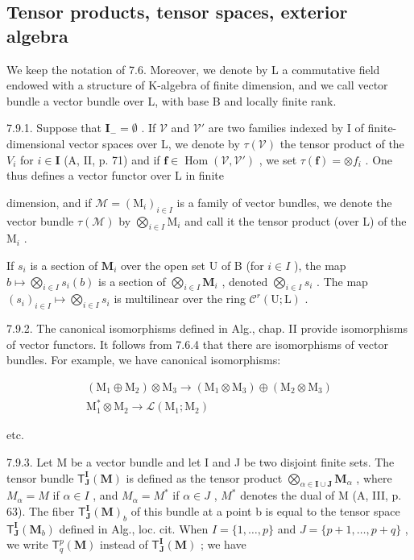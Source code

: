 \subsection{Tensor products, tensor spaces, exterior algebra}

We keep the notation of 7.6. Moreover, we denote by L a commutative field endowed with a structure of K-algebra of finite dimension, and we call vector bundle a vector bundle over L, with base B and locally finite rank.

7.9.1. Suppose that \(\mathbf{I}_{-} = \emptyset\) . If \(\mathcal{V}\) and \(\mathcal{V}'\) are two families indexed by I of finite-dimensional vector spaces over L, we denote by \(\tau(\mathcal{V})\) the tensor product of the \(V_{i}\) for \(i \in \mathbf{I}\) (A, II, p. 71) and if \(\mathbf{f} \in \operatorname{Hom}(\mathcal{V}, \mathcal{V}')\) , we set \(\tau(\mathbf{f}) = \otimes f_{i}\) . One thus defines a vector functor over L in finite

dimension, and if \(\mathcal{M} = (\mathrm{M}_{i})_{i\in I}\) is a family of vector bundles, we denote the vector bundle \(\tau(\mathcal{M})\) by \(\bigotimes_{i\in I}\mathrm{M}_{i}\) and call it the tensor product (over L) of the \(\mathrm{M}_{i}\) .

If \(s_i\) is a section of \(\mathbf{M}_i\) over the open set U of B (for \(i \in I\) ), the map \(b \mapsto \bigotimes_{i \in I} s_i(b)\) is a section of \(\bigotimes_{i \in I} \mathbf{M}_i\) , denoted \(\bigotimes_{i \in I} s_i\) . The map \((s_i)_{i \in I} \mapsto \bigotimes_{i \in I} s_i\) is multilinear over the ring \(\mathcal{C}^r(\mathrm{U}; \mathrm{L})\) .

7.9.2. The canonical isomorphisms defined in Alg., chap. II provide isomorphisms of vector functors. It follows from 7.6.4 that there are isomorphisms of vector bundles. For example, we have canonical isomorphisms:

\[
\begin{array}{c} (\mathrm{M} _ {1} \oplus \mathrm{M} _ {2}) \otimes \mathrm{M} _ {3} \longrightarrow (\mathrm{M} _ {1} \otimes \mathrm{M} _ {3}) \oplus (\mathrm{M} _ {2} \otimes \mathrm{M} _ {3}) \\ \mathrm{M} _ {1} ^ {*} \otimes \mathrm{M} _ {2} \longrightarrow \mathcal {L} (\mathrm{M} _ {1}; \mathrm{M} _ {2}) \end{array}
\]

etc.

7.9.3. Let M be a vector bundle and let I and J be two disjoint finite sets. The tensor bundle \(\mathsf{T}_{\mathbf{J}}^{\mathbf{I}}(\mathbf{M})\) is defined as the tensor product \(\bigotimes_{\alpha\in\mathbf{I}\cup\mathbf{J}}\mathbf{M}_{\alpha}\) , where \(M_{\alpha}=M\) if \(\alpha\in I\) , and \(M_{\alpha}=M^{*}\) if \(\alpha\in J\) , \(M^{*}\) denotes the dual of M (A, III, p. 63). The fiber \(\mathsf{T}_{\mathbf{J}}^{\mathbf{I}}(\mathbf{M})_{b}\) of this bundle at a point b is equal to the tensor space \(\mathsf{T}_{\mathbf{J}}^{\mathbf{I}}(\mathbf{M}_{b})\) defined in Alg., loc. cit. When \(I=\{1,\ldots,p\}\) and \(J=\{p+1,\ldots,p+q\}\) , we write \(\mathsf{T}_{q}^{p}(\mathbf{M})\) instead of \(\mathsf{T}_{\mathbf{J}}^{\mathbf{I}}(\mathbf{M})\) ; we have

